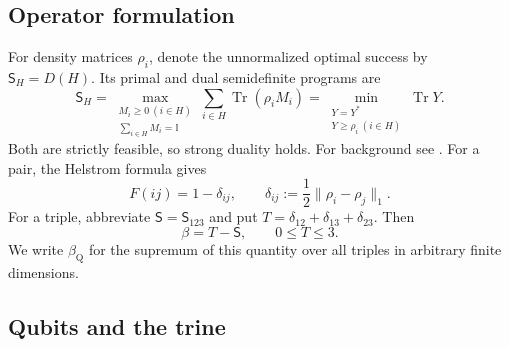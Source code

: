 \documentclass[a4paper,11pt,onecolumn,unpublished]{quantumarticle}
\theoremstyle{definition}
\newcommand{\Tr}{\operatorname{Tr}}
\newcommand{\id}{\mathbb I}
\newcommand{\1}{\mathbf 1}
\newcommand{\Sopt}{\mathsf S}
\begin{document}
\subsection{Operator formulation}

For density matrices $\rho_i$, denote the unnormalized optimal success by
$\Sopt_H=D(H)$. Its primal and dual semidefinite programs are
\begin{equation}\label{eq:quantum-SDP}
 \Sopt_H
 =\max_{\substack{M_i\ge0\ (i\in H)\\\sum_{i\in H}M_i=\id}}
       \sum_{i\in H}\Tr(\rho_iM_i)
 =\min_{\substack{Y=Y^*\\Y\ge\rho_i\ (i\in H)}}\Tr Y.
\end{equation}
Both are strictly feasible, so strong duality holds. For background see
\cite{Helstrom1976,BaeKwek2015}. For a pair, the Helstrom formula gives
\begin{equation}\label{eq:Helstrom}
 F(ij)=1-\delta_{ij},\qquad
 \delta_{ij}:=\frac12\|\rho_i-\rho_j\|_1.
\end{equation}
For a triple, abbreviate $\Sopt=\Sopt_{123}$ and put
$T=\delta_{12}+\delta_{13}+\delta_{23}$. Then
\begin{equation}\label{eq:beta-operator}
 \beta=T-\Sopt,\qquad 0\le T\le3.
\end{equation}
We write $\beta_{\mathrm Q}$ for the supremum of this quantity over all triples
in arbitrary finite dimensions.

\subsection{Qubits and the trine}
\end{document}
